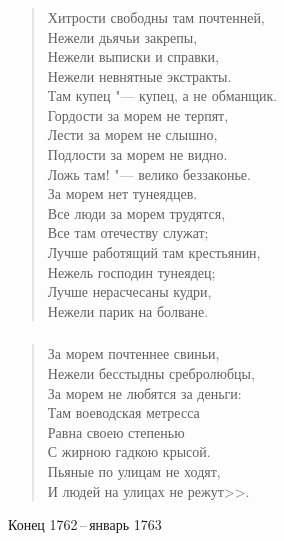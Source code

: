 \documentclass{beamer}
\begin{document}
\begin{frame}
\frametitle{}

\begin{verse}
Хитрости свободны там почтенней,\\
Нежели дьячьи закрепы,\\
Нежели выписки и справки,\\
Нежели невнятные экстракты.\\
Там купец "--- купец, а не обманщик.\\
Гордости за морем не терпят,\\
Лести за морем не слышно,\\
Подлости за морем не видно.\\
Ложь там! "--- велико беззаконье.\\
За морем нет тунеядцев.\\
Все люди за морем трудятся,\\
Все там отечеству служат;\\
Лучше работящий там крестьянин,\\
Нежель господин тунеядец;\\
Лучше нерасчесаны кудри,\\
Нежели парик на болване.
\end{verse}
\end{frame}


\begin{frame}
\frametitle{}

\begin{verse}
За морем почтеннее свиньи,\\
Нежели бесстыдны сребролюбцы,\\
За морем не любятся за деньги:\\
Там воеводская метресса\\
Равна своею степенью\\
С жирною гадкою крысой.\\
Пьяные по улицам не ходят,\\
И людей на улицах не режут>>.\\

\end{verse}
Конец 1762\,--\,январь 1763
\end{frame}
\end{document}
